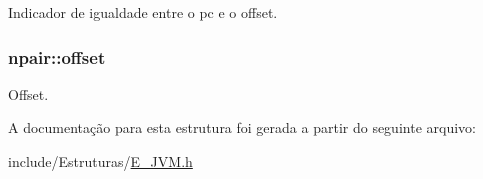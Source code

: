 Indicador de igualdade entre o pc e o offset. 

\hypertarget{structnpair_a333020fa37335ccefe10f2050b24ca6a}{}
\subsubsection[{offset}]{ npair\+::offset}\label{structnpair_a333020fa37335ccefe10f2050b24ca6a}


Offset. 



A documentação para esta estrutura foi gerada a partir do seguinte arquivo\+:\begin{DoxyCompactItemize}
\item 
include/\+Estruturas/\hyperlink{_e___j_v_m_8h}{E\+\_\+\+J\+V\+M.\+h}\end{DoxyCompactItemize}
